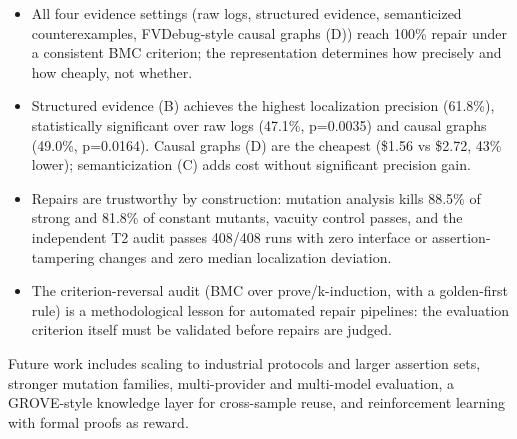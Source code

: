 \documentclass[
  11pt,
]{article}
\providecommand{\tightlist}{%
  \setlength{\itemsep}{0pt}\setlength{\parskip}{0pt}}
\begin{document}
\begin{itemize}
\tightlist
\item
  All four evidence settings (raw logs, structured evidence, semanticized counterexamples, FVDebug-style causal graphs (D)) reach 100\% repair under a consistent BMC criterion; the representation determines how precisely and how cheaply, not whether.
\item
  Structured evidence (B) achieves the highest localization precision (61.8\%), statistically significant over raw logs (47.1\%, p=0.0035) and causal graphs (49.0\%, p=0.0164). Causal graphs (D) are the cheapest (\$1.56 vs \$2.72, 43\% lower); semanticization (C) adds cost without significant precision gain.
\item
  Repairs are trustworthy by construction: mutation analysis kills 88.5\% of strong and 81.8\% of constant mutants, vacuity control passes, and the independent T2 audit passes 408/408 runs with zero interface or assertion-tampering changes and zero median localization deviation.
\item
  The criterion-reversal audit (BMC over prove/k-induction, with a golden-first rule) is a methodological lesson for automated repair pipelines: the evaluation criterion itself must be validated before repairs are judged.
\end{itemize}

Future work includes scaling to industrial protocols and larger assertion sets, stronger mutation families, multi-provider and multi-model evaluation, a GROVE-style knowledge layer for cross-sample reuse, and reinforcement learning with formal proofs as reward.
\end{document}
